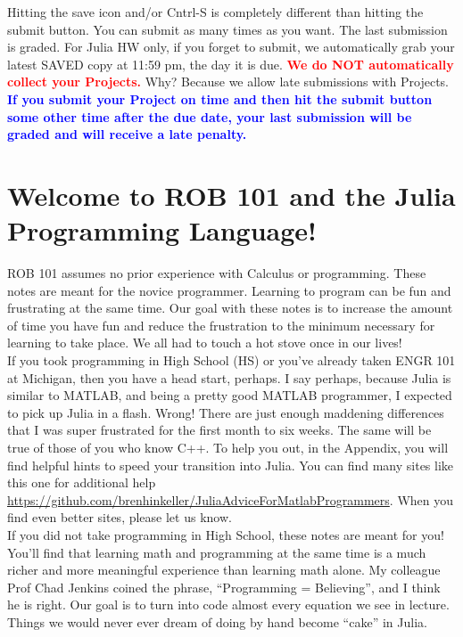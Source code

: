 \begin{remark}  Hitting the save icon and/or Cntrl-S is completely different than hitting the submit button. You can submit as many times as you want. The last submission is graded. For Julia HW only, if you forget to submit, we automatically grab your latest SAVED copy at 11:59 pm, the day it is due. \textcolor{red}{\bf We do NOT automatically collect your Projects.} Why? Because we allow late submissions with Projects. \textcolor{blue}{\bf If you submit your Project on time and then hit the submit button some other time after the due date, your last submission will be graded and will receive a late penalty.}

\end{remark}

\section{Welcome to ROB 101 and the Julia Programming Language!}

ROB 101 assumes no prior experience with Calculus or programming. These notes are meant for the novice programmer. Learning to program can be fun and frustrating at the same time. Our goal with these notes is to increase the amount of time you have fun and reduce the frustration to the minimum necessary for learning to take place. We all had to touch a hot stove once in our lives! \\ %

If you took programming in High School (HS) or you've already taken ENGR 101 at Michigan, then you have a head start, perhaps. I say perhaps, because Julia is similar to MATLAB, and being a pretty good MATLAB programmer, I expected to pick up Julia in a flash. Wrong! There are just enough maddening differences that I was super frustrated for the first month to six weeks. The same will be true of those of you who know C++. To help you out, in the Appendix, you will find helpful hints to speed your transition into Julia. You can find many sites like this one for additional help \url{https://github.com/brenhinkeller/JuliaAdviceForMatlabProgrammers}. When you find even better sites, please let us know.\\

If you did not take programming in High School, these notes are meant for you! You'll find that learning math and programming at the same time is a much richer and more meaningful experience than learning math alone. My colleague Prof Chad Jenkins coined the phrase, ``Programming = Believing'', and I think he is right. Our goal is to turn into code almost every equation we see in lecture. Things we would never ever dream of doing by hand become ``cake'' in Julia. \\

